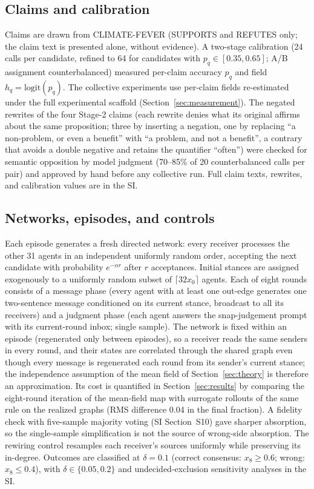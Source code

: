 \documentclass[11pt]{article}
\begin{document}
\subsection*{Claims and calibration}

Claims are drawn from CLIMATE-FEVER \citep{Diggelmann2020} (SUPPORTS and
REFUTES only; the claim text is presented alone, without evidence). A
two-stage calibration (24 calls per candidate, refined to 64 for candidates
with $p_q \in [0.35, 0.65]$; A/B assignment counterbalanced) measured
per-claim accuracy $p_q$ and field $h_q = \mathrm{logit}(p_q)$. The collective
experiments use per-claim fields re-estimated under the full experimental
scaffold (Section~\ref{sec:measurement}). The negated rewrites of the four
Stage-2 claims (each rewrite denies what its original affirms about the
same proposition; three by inserting a negation, one by replacing ``a non-problem, or even a
benefit'' with ``a problem, and not a benefit'', a contrary that avoids a
double negative and retains the quantifier ``often'') were checked for
semantic opposition by model judgment
(70--85\% of 20 counterbalanced calls per pair) and approved by hand before
any collective run. Full claim texts, rewrites, and calibration values are in
the SI.

\subsection*{Networks, episodes, and controls}

Each episode generates a fresh directed network: every receiver processes the
other 31 agents in an independent uniformly random order, accepting the next
candidate with probability $e^{-\alpha r}$ after $r$ acceptances. Initial
stances are assigned exogenously to a uniformly random subset of
$\lceil 32 x_0 \rceil$ agents. Each of eight rounds consists of a message
phase (every agent with at least one out-edge generates one two-sentence
message conditioned on its current stance, broadcast to all its receivers)
and a judgment phase (each agent answers the snap-judgement prompt with its
current-round inbox; single sample). The network is fixed within an episode
(regenerated only between episodes), so a receiver reads the same senders in
every round, and their states are correlated through the shared graph even
though every message is regenerated each round from its sender's current
stance; the independence assumption of the mean field of
Section~\ref{sec:theory} is therefore an approximation. Its cost is
quantified in Section~\ref{sec:results} by comparing the eight-round
iteration of the mean-field map with surrogate rollouts of the same rule on
the realized graphs (RMS difference 0.04 in the final fraction). A fidelity check with five-sample majority voting (SI Section~S10) gave
sharper absorption, so the single-sample simplification is not the source
of wrong-side absorption. The rewiring control resamples each receiver's sources uniformly
while preserving its in-degree. Outcomes are classified at $\delta = 0.1$
(correct consensus: $x_8 \ge 0.6$; wrong: $x_8 \le 0.4$), with
$\delta \in \{0.05, 0.2\}$ and undecided-exclusion sensitivity analyses in
the SI.
\end{document}
